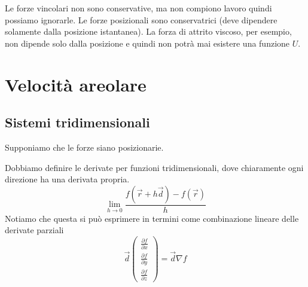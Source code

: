 \documentclass[a4paper]{article}
\begin{document}
Le forze vincolari non sono conservative, ma non compiono lavoro quindi possiamo ignorarle.
Le forze posizionali sono conservatrici (deve dipendere solamente dalla posizione istantanea).
La forza di attrito viscoso, per esempio, non dipende solo dalla posizione e quindi non potrà mai esistere
una funzione \(U\).

\pagebreak

\section{Velocità areolare}

\pagebreak

\subsection{Sistemi tridimensionali}

Supponiamo che le forze siano posizionarie.

Dobbiamo definire le derivate per funzioni tridimensionali, dove chiaramente
ogni direzione ha una derivata propria.
\[
    \lim_{h \to 0} \frac{f(\vec{r} + h\vec{d}) - f(\vec{r})}{h}
\]
Notiamo che
questa si può esprimere in termini come combinazione lineare delle derivate parziali
\[
    \vec{d} \begin{pmatrix}
        \frac{\partial f}{\partial x} \\
        \frac{\partial f}{\partial y} \\
        \frac{\partial f}{\partial z}
    \end{pmatrix}
    = \vec{d} \nabla f
\]

\end{document}
